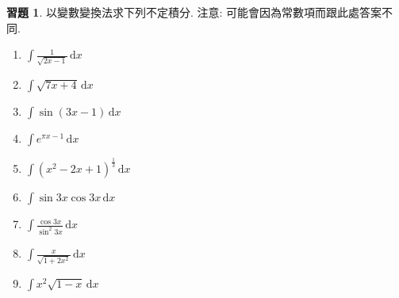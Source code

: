 \documentclass[12pt]{extarticle}
\newcommand{\ds}{\displaystyle}
\theoremstyle{definition}
\newtheorem*{exe}{習題}
\newcommand{\myline}{\noindent\makebox[\linewidth]{\rule{\paperwidth}{0.4pt}}}
\begin{document}
\myline

\begin{exe} 以變數變換法求下列不定積分. 注意: 可能會因為常數項而跟此處答案不同. 
  \begin{multicols}{3}
    \begin{enumerate}\setlength{\itemsep}{0pt}
      \item $\ds\int\!\frac{1}{\sqrt{2 x - 1}}\,\text{d}x $%
      \item $\ds\int\!\sqrt{7x + 4}\,\text{d}x $%
      \item $\ds\int\!\sin(3x - 1)\,\text{d}x $%
      \item $\ds\int\!e^{\pi x - 1}\,\text{d}x $%
      \item $\ds\int\!(x^2 - 2x + 1)^{\frac{1}{3}}\,\text{d}x $%
      \item $\ds\int\!\sin 3x\cos 3x\,\text{d}x $%
      \item $\ds\int\!\frac{\cos 3x}{\sin^2 3x}\,\text{d}x $%
      \item $\ds\int\!\frac{x}{\sqrt{1 + 2x^2}}\,\text{d}x $%
      \item $\ds\int\!x^2\sqrt{1 - x}\,\text{d}x $%
    \end{enumerate} 
  \end{multicols}
\end{exe}
\end{document}
